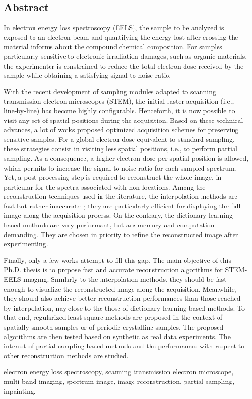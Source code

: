 \begin{fullwidth}

\chapter*{Abstract}
\label{ch:english_resume}

In electron energy loss spectroscopy (EELS), the sample to be analyzed is exposed to an electron beam and quantifying the energy lost after crossing the material informs about the compound chemical composition. For samples particularly sensitive to electronic irradiation damages, such as organic materials, the experimenter is constrained to reduce the total electron dose received by the sample while obtaining a satisfying signal-to-noise ratio.

With the recent development of sampling modules adapted to scanning transmission electron microscopes (STEM), the initial raster acquisition (i.e., line-by-line) has become highly configurable. Henceforth, it is now possible to visit any set of spatial positions during the acquisition. Based on these technical advances, a lot of works proposed optimized acquisition schemes for preserving sensitive samples. For a global electron dose equivalent to standard sampling, these strategies consist in visiting less spatial positions, i.e., to perform partial sampling. As a consequence, a higher electron dose per spatial position is allowed, which permits to increase the signal-to-noise ratio for each sampled spectrum. Yet, a post-processing step is required to reconstruct the whole image, in particular for the spectra associated with non-locations. Among the reconstruction techniques used in the literature, the interpolation methods are fast but rather inaccurate~; they are particularly efficient for displaying the full image along the acquisition process. On the contrary, the dictionary learning-based methods are very performant, but are memory and computation demanding. They are chosen in priority to refine the reconstructed image after experimenting.

Finally, only a few works attempt to fill this gap. The main objective of this Ph.D. thesis is to propose fast and accurate reconstruction algorithms for STEM-EELS imaging. Similarly to the interpolation methods, they should be fast enough to visualize the reconstructed image along the acquisition. Meanwhile, they should also achieve better reconstruction performances than those reached by interpolation, nay close to the those of dictionary learning-based methods. To that end, regularized least square methods are proposed in the context of spatially smooth samples or of periodic crystalline samples. The proposed algorithms are then tested based on synthetic as real data experiments. The interest of partial-sampling based methods and the performances with respect to other reconstruction methods are studied.


\vspace{1em}
%
electron energy loss spectroscopy, 
scanning transmission electron microscope, 
multi-band imaging, 
spectrum-image,
image reconstruction, 
partial sampling,
inpainting.

\end{fullwidth}